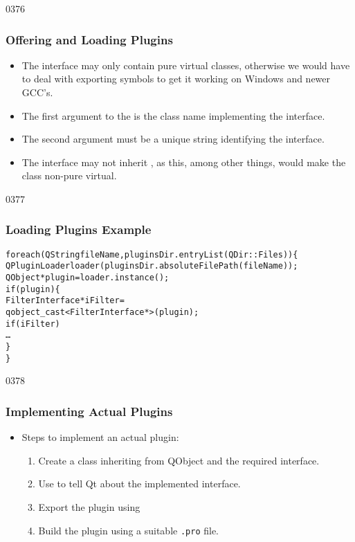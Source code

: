 \begin{slide}{0376}\frametitle{Offering and Loading Plugins}
\begin{itemize}
\item The interface may only contain pure virtual classes, otherwise we
  would have to deal with exporting symbols to get it working on Windows
  and newer GCC's.
\item The first argument to the  is the
  class name implementing the interface.
\item The second argument must be a unique string identifying the
  interface.
\item The interface may not inherit , as this, among other
  things, would make the class non-pure virtual.
\end{itemize}
\end{slide}

\begin{slide}[fragile]{0377}
\frametitle{Loading Plugins Example}
  \begin{alltt}\small
foreach (QString fileName, pluginsDir.entryList(QDir::Files)) \{
    QPluginLoader loader(pluginsDir.absoluteFilePath(fileName));
    QObject* plugin = loader.instance();
    if (plugin) \{
        FilterInterface* iFilter =
              qobject_cast<FilterInterface*>(plugin);
        if (iFilter)
            \ldots
    \}
\}
\end{alltt}
\end{slide}



\begin{slide}{0378}
\frametitle{Implementing Actual Plugins}
\begin{itemize}
\item Steps to implement an actual plugin:
  \begin{enumerate}
  \item Create a class inheriting from QObject and the required interface.
  \item Use  to tell Qt about the implemented interface.
  \item Export the plugin using 
  \item Build the plugin using a suitable \texttt{.pro} file.
 \end{enumerate}
\end{itemize}
\end{slide}



